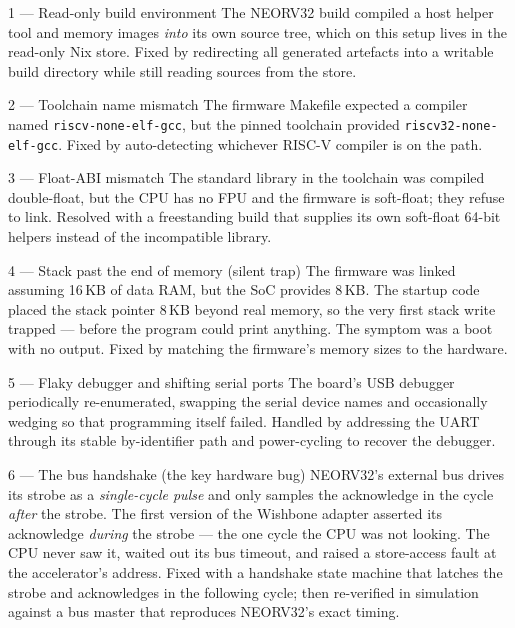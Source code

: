 \documentclass[11pt,a4paper]{article}
\newcommand{\code}[1]{\texttt{\small #1}}
\begin{document}
\begin{bugbox}{1 --- Read-only build environment}
The NEORV32 build compiled a host helper tool and memory images \emph{into} its
own source tree, which on this setup lives in the read-only Nix store. Fixed by
redirecting all generated artefacts into a writable build directory while still
reading sources from the store.
\end{bugbox}

\begin{bugbox}{2 --- Toolchain name mismatch}
The firmware Makefile expected a compiler named \code{riscv-none-elf-gcc}, but the
pinned toolchain provided \code{riscv32-none-elf-gcc}. Fixed by auto-detecting
whichever RISC-V compiler is on the path.
\end{bugbox}

\begin{bugbox}{3 --- Float-ABI mismatch}
The standard library in the toolchain was compiled double-float, but the CPU has
no FPU and the firmware is soft-float; they refuse to link. Resolved with a
freestanding build that supplies its own soft-float 64-bit helpers instead of the
incompatible library.
\end{bugbox}

\begin{bugbox}{4 --- Stack past the end of memory (silent trap)}
The firmware was linked assuming 16\,KB of data RAM, but the SoC provides 8\,KB.
The startup code placed the stack pointer 8\,KB beyond real memory, so the very
first stack write trapped --- before the program could print anything. The symptom
was a boot with no output. Fixed by matching the firmware's memory sizes to the
hardware.
\end{bugbox}

\begin{bugbox}{5 --- Flaky debugger and shifting serial ports}
The board's USB debugger periodically re-enumerated, swapping the serial device
names and occasionally wedging so that programming itself failed. Handled by
addressing the UART through its stable by-identifier path and power-cycling to
recover the debugger.
\end{bugbox}

\begin{bugbox}{6 --- The bus handshake (the key hardware bug)}
NEORV32's external bus drives its strobe as a \emph{single-cycle pulse} and only
samples the acknowledge in the cycle \emph{after} the strobe. The first version of
the Wishbone adapter asserted its acknowledge \emph{during} the strobe --- the one
cycle the CPU was not looking. The CPU never saw it, waited out its bus timeout,
and raised a store-access fault at the accelerator's address. Fixed with a
handshake state machine that latches the strobe and acknowledges in the following
cycle; then re-verified in simulation against a bus master that reproduces
NEORV32's exact timing.
\end{bugbox}
\end{document}

